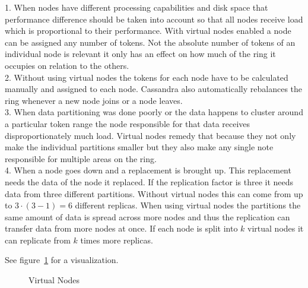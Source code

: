 1. When nodes have different processing capabilities and disk space that performance difference should be taken into account so that all nodes receive load which is proportional to their performance. With virtual nodes enabled a node can be assigned any number of tokens. Not the absolute number of tokens of an individual node is relevant it only has an effect on how much of the ring it occupies on relation to the others.  \\
2. Without using virtual nodes the tokens for each node have to be calculated manually and assigned to each node. Cassandra also automatically rebalances the ring whenever a new node joins or a node leaves. \\
3. When data partitioning was done poorly or the data happens to cluster around a particular token range the node responsible for that data receives disproportionately much load. Virtual nodes remedy that because they not only make the individual partitions smaller but they also make any single note responsible for multiple areas on the ring. \\
4. When a node goes down and a replacement is brought up. This replacement needs the data of the node it replaced. If the replication factor is three it needs data from three different partitions. Without virtual nodes this can come from up to $3\cdot(3-1)=6$ different replicas. When using virtual nodes the partitions the same amount of data is spread across more nodes and thus the replication can transfer data from more nodes at once. If each node is split into $k$ virtual nodes it can replicate from $k$ times more replicas.

See figure~\ref{fig:cassandra:vnodes} for a visualization.

\begin{figure}[ht]
  \centering
  \caption{Virtual Nodes}
  \label{fig:cassandra:vnodes}
\end{figure}

